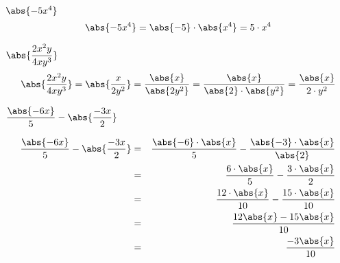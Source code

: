  \begin{exem}
  $\abs{-5x^4}$
\begin{equation}
\abs{-5x^4}= \abs{-5}\cdot \abs{x^4}= 5 \cdot x^4
\end{equation}
 \end{exem}
 
 \begin{exem}
  $\abs{\dfrac{2x^2y}{4xy^3}}$
\begin{equation}
\abs{\dfrac{2x^2y}{4xy^3}} = \abs{\dfrac{x}{2y^2}}= \dfrac{\abs{x}}{\abs{2y^2}}= \dfrac{\abs{x}}{\abs{2} \cdot \abs{y^2}}= \frac{\abs{x}}{2 \cdot y^2}
\end{equation}
 \end{exem}
 
 \begin{exem}
  $\dfrac{\abs{-6x}}{5} - \abs{\dfrac{-3x}{2}}$

 \begin{eqnarray*}
  \dfrac{\abs{-6x}}{5} - \abs{\dfrac{-3x}{2}} &=&
 \dfrac{\abs{-6}\cdot \abs{x}}{5} - \dfrac{\abs{-3} \cdot \abs{x}}{\abs{2}} \\
 &=& \dfrac{6 \cdot \abs{x}}{5} - \dfrac{ 3 \cdot \abs{x}}{2} \\
 &=& \dfrac{12 \cdot \abs{x}}{10} - \dfrac{15 \cdot \abs{x}}{10} \\
 &=& \dfrac{12\abs{x} - 15\abs{x}}{10} \\
 &=& \dfrac{-3\abs{x}}{10}
 \end{eqnarray*}

\end{exem}

